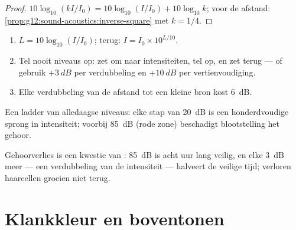 \begin{proof}
$10\log_{10}(kI/I_0) = 10\log_{10}(I/I_0) + 10\log_{10}k$; voor de
afstand: \cref{prop:g12:sound-acoustics:inverse-square} met $k = 1/4$.
\end{proof}

\begin{method}\label{met:g12:sound-acoustics:db}
\begin{enumerate}
  \item $L = 10\log_{10}(I/I_0)$; terug: $I = I_0 \times 10^{L/10}$.
  \item Tel nooit niveaus op: zet om naar intensiteiten, tel op, en zet
        terug --- of gebruik $+\qty{3}{dB}$ per verdubbeling en
        $+\qty{10}{dB}$ per vertienvoudiging.
  \item Elke verdubbeling van de afstand tot een kleine bron kost
        \qty{6}{dB}.
\end{enumerate}
\end{method}

\begin{omfigure}

{\small Een ladder van alledaagse niveaus: elke stap van \qty{20}{dB} is
een honderdvoudige sprong in intensiteit; voorbij \qty{85}{dB} (rode zone)
beschadigt blootstelling het gehoor.}
\end{omfigure}

\begin{remark}[Gehoorschade]\label{rem:g12:sound-acoustics:damage}
Gehoorverlies is een kwestie van : \qty{85}{dB} is acht uur lang
veilig, en elke \qty{3}{dB} meer --- een verdubbeling van de intensiteit
--- halveert de veilige tijd; verloren haarcellen groeien niet terug.
\end{remark}

\section{Klankkleur en boventonen}

